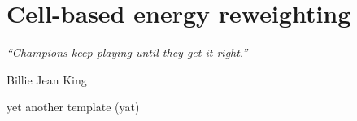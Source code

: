 \chapter{Cell-based energy reweighting}
\label{ch:cellrw}
\epigraph{\emph{“Champions keep playing until they get it right.”}}{Billie Jean King}

yet another template (yat)